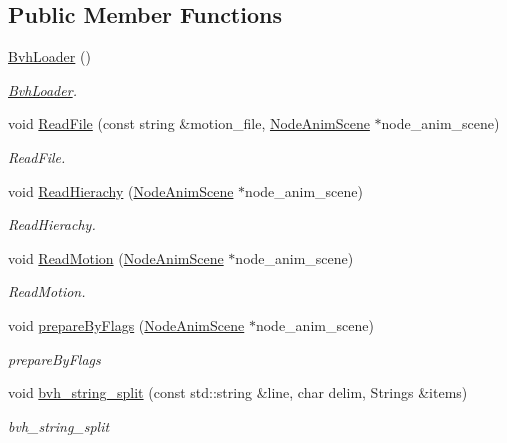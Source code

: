 \subsection*{Public Member Functions}
\begin{DoxyCompactItemize}
\item 
\hyperlink{classEngine_1_1BvhLoader_a6ce825c92ae428a0366410eab5d990aa}{Bvh\+Loader} ()
\begin{DoxyCompactList}\small\item\em \hyperlink{classEngine_1_1BvhLoader}{Bvh\+Loader}. \end{DoxyCompactList}\item 
void \hyperlink{classEngine_1_1BvhLoader_abd58f0b7f498fcb4f25bfe7f15a310d4}{Read\+File} (const string \&motion\+\_\+file, \hyperlink{classEngine_1_1NodeAnimScene}{Node\+Anim\+Scene} $\ast$node\+\_\+anim\+\_\+scene)
\begin{DoxyCompactList}\small\item\em Read\+File. \end{DoxyCompactList}\item 
void \hyperlink{classEngine_1_1BvhLoader_a599ca8a71e770128f27769e13f12aa63}{Read\+Hierachy} (\hyperlink{classEngine_1_1NodeAnimScene}{Node\+Anim\+Scene} $\ast$node\+\_\+anim\+\_\+scene)
\begin{DoxyCompactList}\small\item\em Read\+Hierachy. \end{DoxyCompactList}\item 
void \hyperlink{classEngine_1_1BvhLoader_ac22c70132e353ef1a91135911e8c1382}{Read\+Motion} (\hyperlink{classEngine_1_1NodeAnimScene}{Node\+Anim\+Scene} $\ast$node\+\_\+anim\+\_\+scene)
\begin{DoxyCompactList}\small\item\em Read\+Motion. \end{DoxyCompactList}\item 
void \hyperlink{classEngine_1_1BvhLoader_af97fd5b3c463a2d7cb83b091173a2d2e}{prepare\+By\+Flags} (\hyperlink{classEngine_1_1NodeAnimScene}{Node\+Anim\+Scene} $\ast$node\+\_\+anim\+\_\+scene)
\begin{DoxyCompactList}\small\item\em prepare\+By\+Flags \end{DoxyCompactList}\item 
void \hyperlink{classEngine_1_1BvhLoader_a4840a1a13d575617171caa923de7a494}{bvh\+\_\+string\+\_\+split} (const std\+::string \&line, char delim, Strings \&items)
\begin{DoxyCompactList}\small\item\em bvh\+\_\+string\+\_\+split \end{DoxyCompactList}\item 

\end{DoxyCompactItemize}
